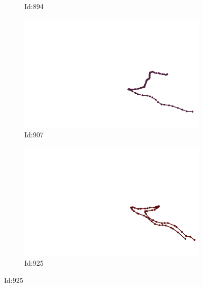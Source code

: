 \documentclass[12pt,twoside]{report}
\begin{document}
\begin{figure}
\begin{subfigure}[b]{0.20\textwidth}
\caption{Id:894}
\end{subfigure}
\begin{subfigure}[b]{0.20\textwidth}
\centering
\includegraphics[width=\textwidth]{../trajectories/907.png}
\caption{Id:907}
\end{subfigure}
\begin{subfigure}[b]{0.20\textwidth}
\centering
\includegraphics[width=\textwidth]{../trajectories/925.png}
\caption{Id:925}
\end{subfigure}
\end{figure}
\end{document}
